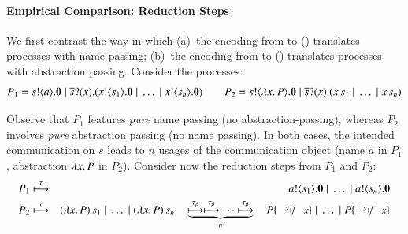 \documentclass[runningheads]{llncs}
\begin{document}
{\paragraph{Empirical Comparison: Reduction Steps}
We first contrast the way in which 
(a)~the encoding from \HOp to \HO () translates processes with name passing;
(b)~the encoding from \HOp to \sessp () translates processes with abstraction passing.
Consider the \HOp processes:
$$
P_1  =  s ! \langle a \rangle . \mathbf{0} \;|\; \overline{s} ? (x) . (x ! \langle s_1 \rangle . \mathbf{0} \;|\; \dots \;|\; x ! \langle s_n \rangle . \mathbf{0}) \qquad
P_2  =  s ! \langle \lambda x.\,P \rangle . \mathbf{0} \;|\; \overline{s} ? (x) . (x\, {s_1} \;|\; \dots \;|\; x\, {s_n})
$$

\noi Observe that $P_1$ features \emph{pure} name passing (no abstraction-passing), whereas 
$P_2$ involves \emph{pure} abstraction passing (no name passing). In both cases, 
the intended communication on $s$ leads to $n$ usages of the communication object (name $a$ in $P_1$, abstraction $\lambda x.\,P$ in $P_2$).
Consider now the reduction steps from $P_1$ and $P_2$:
\begin{eqnarray*}
P_1 & \hby{\tau} & \bout{a}{s_1} \inact \Par \dots \Par \bout{a}{s_n} \inact \\
P_2 & \hby{\tau}& \appl{(\abs{x}{P})}{s_1} \Par \dots \Par \appl{(\abs{x}{P})}{s_n} \quad 
\underbrace{\hby{\btau}\hby{\btau} \cdots \hby{\btau}}_{n} 
\quad P \subst{s_1}{x} \Par \dots \Par P \subst{s_1}{x} 
\end{eqnarray*}

}
\end{document}
